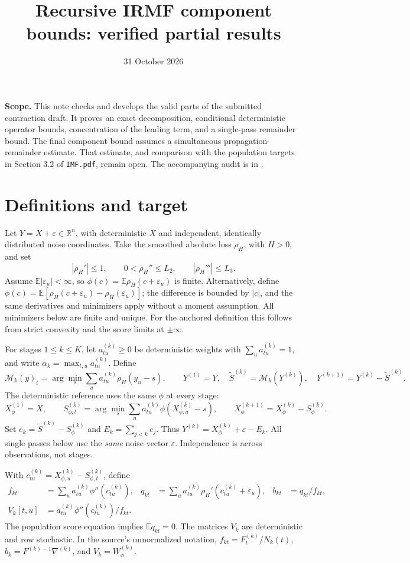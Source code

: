 \documentclass[11pt]{article}
\title{Recursive IRMF component bounds: verified partial results}
\author{}
\date{31 October 2026}
\newcommand{\E}{\mathbb E}
\newcommand{\R}{\mathbb R}
\theoremstyle{remark}
\begin{document}
\maketitle

\noindent\textbf{Scope.}
This note checks and develops the valid parts of the submitted contraction
draft. It proves an exact decomposition,
conditional deterministic operator bounds, concentration of the leading term,
and a single-pass remainder bound. The final component bound assumes a
simultaneous propagation-remainder estimate. That estimate, and comparison
with the population targets in Section 3.2 of \texttt{IMF.pdf}, remain open.
The accompanying audit is in
.

\section{Definitions and target}
Let \(Y=X+\varepsilon\in\R^n\), with deterministic \(X\) and independent,
identically distributed noise coordinates. Take the smoothed absolute loss
\(\rho_H\), with \(H>0\), and set
\[
 |\rho_H'|\le1,\qquad 0<\rho_H''\le L_2,\qquad
 |\rho_H'''|\le L_3.
\]
Assume \(\E|\varepsilon_u|<\infty\), so
\(\phi(c)=\E\rho_H(c+\varepsilon_u)\) is finite. Alternatively, define
\(\phi(c)=\E[\rho_H(c+\varepsilon_u)-\rho_H(\varepsilon_u)]\);
the difference is bounded by \(|c|\), and the same derivatives and minimizers
apply without a moment assumption. All minimizers below are finite and
unique. For the anchored definition this follows from strict convexity and
the score limits at \(\pm\infty\).

For stages \(1\le k\le K\), let \(a^{(k)}_{tu}\ge0\) be deterministic weights
with \(\sum_u a^{(k)}_{tu}=1\), and write
\(\alpha_k=\max_{t,u}a^{(k)}_{tu}\). Define
\[
 \mathcal M_k(y)_t=\arg\min_s\sum_u a^{(k)}_{tu}\rho_H(y_u-s),\qquad
 Y^{(1)}=Y,\quad \widetilde S^{(k)}=\mathcal M_k(Y^{(k)}),\quad
 Y^{(k+1)}=Y^{(k)}-\widetilde S^{(k)}.
\]
The deterministic reference uses the same \(\phi\) at every stage:
\[
 X_\phi^{(1)}=X,\qquad
 S_{\phi,t}^{(k)}=\arg\min_s\sum_u a^{(k)}_{tu}\phi(X_{\phi,u}^{(k)}-s),
 \qquad X_\phi^{(k+1)}=X_\phi^{(k)}-S_\phi^{(k)}.
\]
Set \(e_k=\widetilde S^{(k)}-S_\phi^{(k)}\) and
\(E_k=\sum_{j<k}e_j\). Thus \(Y^{(k)}=X_\phi^{(k)}+\varepsilon-E_k\).
All single passes below use the \emph{same} noise vector \(\varepsilon\).
Independence is across observations, not stages.

With \(c^{(k)}_{tu}=X_{\phi,u}^{(k)}-S_{\phi,t}^{(k)}\), define
\begin{align*}
 f_{kt}&=\sum_u a^{(k)}_{tu}\phi''(c^{(k)}_{tu}),&
 q_{kt}&=\sum_u a^{(k)}_{tu}\rho_H'(c^{(k)}_{tu}+\varepsilon_u),&
 b_{kt}&=q_{kt}/f_{kt},\\
 V_k[t,u]&=a^{(k)}_{tu}\phi''(c^{(k)}_{tu})/f_{kt}.&&
\end{align*}
The population score equation implies \(\E q_{kt}=0\).
The matrices \(V_k\) are deterministic and row stochastic. In the source's
unnormalized notation, \(f_{kt}=F_t^{(k)}/N_k(t)\), \(b_k=F^{(k)-1}\nabla^{(k)}\),
and \(V_k=W_\phi^{(k)}\).
\end{document}
